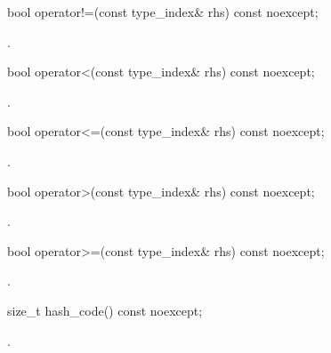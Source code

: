 %
\begin{itemdecl}
bool operator!=(const type_index& rhs) const noexcept;
\end{itemdecl}

\begin{itemdescr}
\pnum
\returns {}.
\end{itemdescr}

%
\begin{itemdecl}
bool operator<(const type_index& rhs) const noexcept;
\end{itemdecl}

\begin{itemdescr}
\pnum
\returns {}.
\end{itemdescr}

%
\begin{itemdecl}
bool operator<=(const type_index& rhs) const noexcept;
\end{itemdecl}

\begin{itemdescr}
\pnum
\returns {}.
\end{itemdescr}

%
\begin{itemdecl}
bool operator>(const type_index& rhs) const noexcept;
\end{itemdecl}

\begin{itemdescr}
\pnum
\returns {}.
\end{itemdescr}

%
\begin{itemdecl}
bool operator>=(const type_index& rhs) const noexcept;
\end{itemdecl}

\begin{itemdescr}
\pnum
\returns {}.
\end{itemdescr}

%
\begin{itemdecl}
size_t hash_code() const noexcept;
\end{itemdecl}

\begin{itemdescr}
\pnum
\returns {}.
\end{itemdescr}

